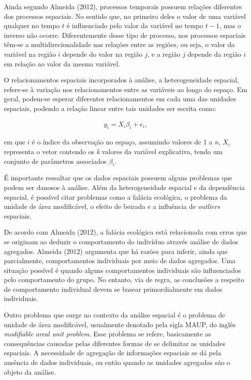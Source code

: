 \documentclass[12pt, a4paper,brazil,oneside]{article}
\begin{document}
	Ainda segundo Almeida (2012), processos temporais possuem relações diferentes dos processos espaciais. No sentido que, no primeiro deles o valor de uma variável qualquer no tempo $t$ é influenciado pelo valor da variável no tempo $t-1$, mas o inverso não ocorre. Diferentemente desse tipo de processo, nos  processos espaciais têm-se a multidirecionalidade nas relações entre as regiões, ou seja, o valor da variável na região $i$ depende do valor na região $j$, e a região $j$ depende da região $i$ em relação ao valor da mesma variável.
	
	
	O relacionamentos espaciais incorporados à análise, a heterogeneidade espacial, refere-se à variação nos relacionamentos entre as variáveis ao longo do espaço. Em geral, podem-se esperar diferentes relacionamentos em cada uma das unidades espaciais, podendo a relação linear entre tais unidades ser escrita como:
	
	\begin{align*}
	y_i = X_i \beta_ i + \epsilon_i,
	\end{align*}
	
	\noindent em que $i$ é o índice da observação no espaço, assumindo valores de 1 a \textit{n}, $X_i$ representa o vetor contendo os \textit{k} valores da variável explicativa, tendo um conjunto de parâmetros associados $\beta_i$.
	
	É importante ressaltar que os dados espaciais possuem alguns problemas que podem ser danosos à análise. Além da heterogeneidade espacial e da dependência espacial, é possível citar problemas como a falácia ecológica, o problema da unidade de área modificável, o efeito de beirada e a influência de \textit{outliers} espaciais. 
	
	De acordo com Almeida (2012), a falácia ecológica está relacionada com erros que se originam ao deduzir o comportamento do indivíduo através análise de dados agregados. Almeida (2012) argumenta que há razões para inferir, ainda que parcialmente, comportamentos individuais por meio de dados agregados. Uma situação possível é quando alguns comportamentos individuais são influenciados pelo comportamento do grupo. No entanto, via de regra, as conclusões a respeito de comportamento individual devem se basear primordialmente em dados individuais. 
	
	Outro problema que surge no contexto da análise espacial é o  problema de unidade de área modificável, usualmente denotado pela sigla MAUP, do inglês \textit{modifiable areal unit problem}. Esse problema se refere, basicamente as consequências causadas pelas diferentes formas de se delimitar as unidades espaciais. A necessidade de agregação de informações espaciais se dá pela ausência de dados individuais, ou então quando as unidades agregadas são o objeto da análise.
	
\end{document}
